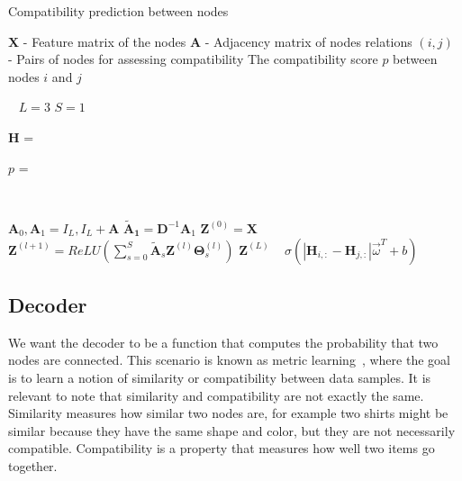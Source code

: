\documentclass[10pt,twocolumn,letterpaper]{article}
\begin{document}
\begin{algorithm}[t]
\caption{Compatibility prediction between nodes}
\label{alg:method}
\begin{algorithmic}[1]
\Input
\Statex $\boldsymbol{X}$ - Feature matrix of the nodes
\Statex $\boldsymbol{A}$ - Adjacency matrix of nodes relations
\Statex $(i, j)$ - Pairs of nodes for assessing compatibility
\Output The compatibility score $p$ between nodes $i$ and $j$

\Statex ~
\State $L = 3$ 
\State $S = 1$ 

\State $\boldsymbol{H}$  = 

\State $p$  = 

\Statex ~

  \State $\boldsymbol{A}_0, \boldsymbol{A}_1 = I_L, I_L+\boldsymbol{A}$
  \State $\boldsymbol{\tilde{A}_1} = \boldsymbol{D}^{-1}\boldsymbol{A}_1$ 
  \State $\boldsymbol{Z}^{(0)} = \boldsymbol{X}$
        \State $\boldsymbol{Z}^{(l+1)} = ReLU \left( \sum\limits_{s=0}^S \boldsymbol{\tilde{A}}_s\boldsymbol{Z}^{(l)}\boldsymbol{\Theta}_s^{(l)} \right)$
    \EndFor
  \State \Return $\boldsymbol{Z}^{(L)}$
\EndFunction
\Statex ~
  \State \Return $ \sigma \left(\left|\boldsymbol{H}_{i,:} - \boldsymbol{H}_{j,:}\right| \vec{\omega}^{T} + b\right)$
\EndFunction


\end{algorithmic}
\end{algorithm}

\subsection{Decoder}
\label{ssec:decoder}
We want the decoder to be a function that computes the probability that two nodes are connected. This scenario is known as metric learning~\cite{bellet2013survey}, where the goal is to learn a notion of similarity or compatibility between data samples. It is relevant to note that similarity and compatibility are not exactly the same. Similarity measures how similar two nodes are, for example two shirts might be similar because they have the same shape and color, but they are not necessarily compatible. Compatibility is a property that measures how well two items go together.
\end{document}
